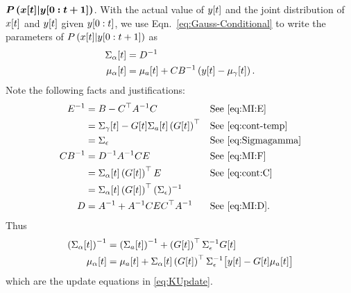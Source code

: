 \begin{enumerate}
{    $\bm{P\left({x}{[t]}|y[0:t+1] \right)}$.}  With the
  actual value of ${y}{[t]}$ and the joint distribution of
  ${x}{[t]}$ and ${y}{[t]}$ given $y[0:t]$, we use
  Eqn.~\eqref{eq:Gauss-Conditional} to write the parameters of
  $P\left({x}{[t]}|y[0:t+1] \right)$ as
  \begin{subequations}
    \label{eq:UpdateRaw}
    \begin{align}
      {\Sigma_\alpha}{[t]} &= D^{-1} \\
      {\mu_\alpha}{[t]} &= {\mu_a}{[t]} + CB^{-1} \left(
        {y}{[t]} - {\mu_\gamma}{[t]}\right).
    \end{align}
  \end{subequations}
  Note the following facts and justifications:
  \begin{align*}
    E^{-1} &= B - C^\top A^{-1}C && \text{See \eqref{eq:MI:E}}\\
    &= {\Sigma_\gamma}{[t]} - {G}{[t]}{\Sigma_a}{[t]} \left(
    {G}{[t]}\right)^\top && \text{See \eqref{eq:cont-temp}}\\
    &= \Sigma_\epsilon && \text{See \eqref{eq:Sigmagamma}}\\
    CB^{-1} &= D^{-1}A^{-1}CE && \text{See \eqref{eq:MI:F}} \\
    &= {\Sigma_\alpha}{[t]} \left( {G}{[t]}
    \right)^\top E && \text{See \eqref{eq:cont:C}}\\
    &= {\Sigma_\alpha}{[t]} \left( {G}{[t]}
    \right)^\top (\Sigma_\epsilon)^{-1}\\
    D &= A^{-1} + A^{-1} CEC^\top A^{-1} && \text{See \eqref{eq:MI:D}}.
  \end{align*}
  Thus
    \begin{align*}
      \left( {\Sigma_\alpha}{[t]} \right)^{-1} &= \left(
        {\Sigma_a}{[t]} \right)^{-1} + \left( {G}{[t]}
        \right)^\top \Sigma_\epsilon^{-1} {G}{[t]} \\
      {\mu_\alpha}{[t]} &= {\mu_a}{[t]} +
      {\Sigma_{\alpha}}{[t]} \left( {G}{[t]} \right)^\top
      \Sigma_\epsilon^{-1} \big[{y}{[t]} - {G}{[t]}
      {\mu_a}{[t]}\big]
    \end{align*}
  which are the update equations in \eqref{eq:KUpdate}.
\end{enumerate}

